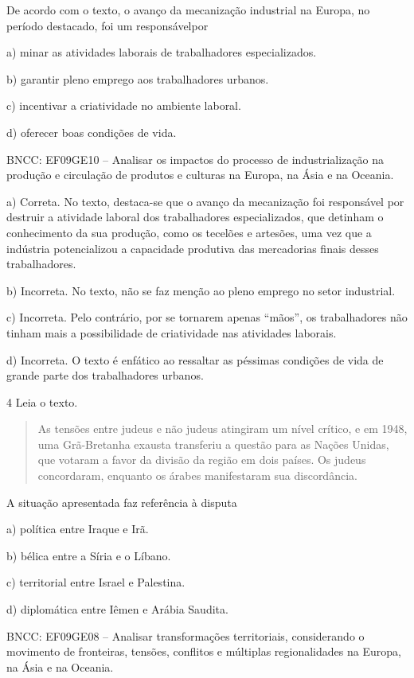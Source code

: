 De acordo com o texto, o avanço da mecanização industrial na Europa, no
período destacado, foi um responsávelpor

a)  minar as atividades laborais de trabalhadores especializados.

b)  garantir pleno emprego aos trabalhadores urbanos.

c)  incentivar a criatividade no ambiente laboral.

d)  oferecer boas condições de vida.

BNCC: EF09GE10 -- Analisar os impactos do processo de industrialização na
produção e circulação de produtos e culturas na Europa, na Ásia e na
Oceania.

a) Correta. No texto, destaca-se que o avanço da mecanização foi
responsável por destruir a atividade laboral dos trabalhadores
especializados, que detinham o conhecimento da sua produção, como os
tecelões e artesões, uma vez que a indústria potencializou a capacidade
produtiva das mercadorias finais desses trabalhadores.

b) Incorreta. No texto, não se faz menção ao pleno emprego no setor
industrial.

c) Incorreta. Pelo contrário, por se tornarem apenas ``mãos'', os
trabalhadores não tinham mais a possibilidade de criatividade nas
atividades laborais.

d) Incorreta. O texto é enfático ao ressaltar as péssimas condições de
vida de grande parte dos trabalhadores urbanos.

\num{4} Leia o texto.

\begin{quote}
As tensões entre judeus e não judeus atingiram um nível crítico, e em 1948, uma Grã-Bretanha exausta transferiu a questão para as Nações Unidas, que votaram a favor da divisão da região em dois países. Os judeus concordaram, enquanto os árabes manifestaram sua discordância.

\end{quote}

A situação apresentada faz referência à disputa

a)  política entre Iraque e Irã.

b)  bélica entre a Síria e o Líbano.

c)  territorial entre Israel e Palestina.

d)  diplomática entre Iêmen e Arábia Saudita.

BNCC: EF09GE08 -- Analisar transformações territoriais, considerando o
movimento de fronteiras, tensões, conflitos e múltiplas regionalidades
na Europa, na Ásia e na Oceania.

